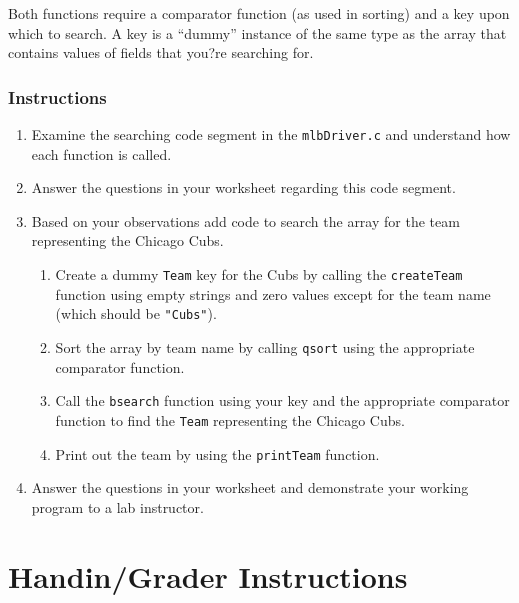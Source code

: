 \documentclass[12pt]{scrartcl}
\begin{document}
Both functions require a comparator function (as used in sorting) and a
key upon which to search.  A key is a ``dummy'' instance of the same type
as the array that contains values of fields that you?re searching for.

\subsubsection*{Instructions}

\begin{enumerate}
  \item Examine the searching code segment in the \texttt{mlbDriver.c}
	and understand how each function is called.
  \item Answer the questions in your worksheet regarding this code segment.
  \item Based on your observations add code to search the array for the
	team representing the Chicago Cubs.
  \begin{enumerate}
    \item Create a dummy \texttt{Team} key for the Cubs by
    calling the \texttt{createTeam} function using empty strings and
    zero values except for the team name (which should be \texttt{"Cubs"}).
    \item Sort the array by team name by calling \texttt{qsort} using
    the appropriate comparator function.
    \item Call the \texttt{bsearch} function using your key and the
    appropriate comparator function to find the \texttt{Team} representing
    the Chicago Cubs.
    \item Print out the team by using the \texttt{printTeam} function.
  \end{enumerate}
  \item Answer the questions in your worksheet and demonstrate your
    working program to a lab instructor.
\end{enumerate}


\section{Handin/Grader Instructions}
\end{document}
